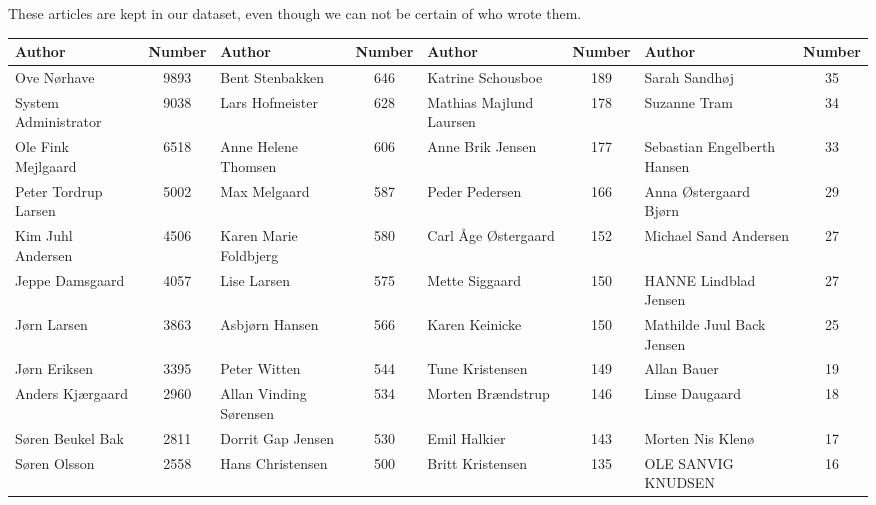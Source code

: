 These articles are kept in our dataset, even though we can not be certain of who wrote them.

\begin{table*}[h]
	\centering
	\scriptsize
	\begin{tabular}{l|c|l|c|l|c|l|c}
		Author                & Number & Author                     & Number & Author                       & Number & Author                       & Number \\
		\toprule
		Ove Nørhave           &  9893  & Bent Stenbakken            &  646   & Katrine Schousboe            &  189   & Sarah Sandhøj                &   35   \\
		System Administrator  &  9038  & Lars Hofmeister            &  628   & Mathias Majlund Laursen      &  178   & Suzanne Tram                 &   34   \\
		Ole Fink Mejlgaard    &  6518  & Anne Helene Thomsen        &  606   & Anne Brik Jensen             &  177   & Sebastian Engelberth Hansen  &   33   \\
		Peter Tordrup Larsen  &  5002  & Max Melgaard               &  587   & Peder Pedersen               &  166   & Anna Østergaard Bjørn        &   29   \\
		Kim Juhl Andersen     &  4506  & Karen Marie Foldbjerg      &  580   & Carl Åge Østergaard          &  152   & Michael Sand Andersen        &   27   \\
		Jeppe Damsgaard       &  4057  & Lise Larsen                &  575   & Mette Siggaard               &  150   & HANNE Lindblad Jensen        &   27   \\
		Jørn Larsen           &  3863  & Asbjørn Hansen             &  566   & Karen Keinicke               &  150   & Mathilde Juul Back Jensen    &   25   \\
		Jørn Eriksen          &  3395  & Peter Witten               &  544   & Tune Kristensen              &  149   & Allan Bauer                  &   19   \\
		Anders Kjærgaard      &  2960  & Allan Vinding Sørensen     &  534   & Morten Brændstrup            &  146   & Linse Daugaard               &   18   \\
		Søren Beukel Bak      &  2811  & Dorrit Gap Jensen          &  530   & Emil Halkier                 &  143   & Morten Nis Klenø             &   17   \\
		Søren Olsson          &  2558  & Hans Christensen           &  500   & Britt Kristensen             &  135   & OLE SANVIG KNUDSEN           &   16   \\

\end{tabular}
\end{table*}
